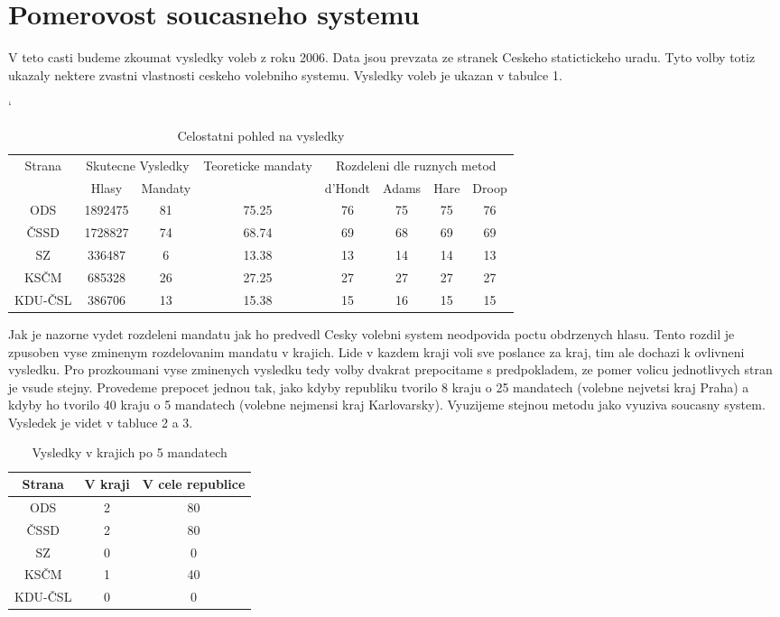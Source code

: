 \documentclass[12pt,a4paper]{scrreprt}
\begin{document}
\section{Pomerovost soucasneho systemu}
V teto casti budeme zkoumat vysledky voleb z roku 2006. 
Data jsou prevzata ze stranek Ceskeho statictickeho uradu.\autocite{CSU}
Tyto volby totiz ukazaly nektere zvastni vlastnosti ceskeho volebniho systemu.
Vysledky voleb je ukazan v tabulce 1.
\begin{table}[tbp]
\catcode`
\begin{tabular}{|c|c|c|c|c|c|c|c|}
\hline
\multirow{2}{*}{Strana}  & \multicolumn{2}{|c|}{Skutecne Vysledky} & \multirow{2}{*}{Teoreticke mandaty} & \multicolumn{4}{|c|}{Rozdeleni dle ruznych metod} \\ \cline{2-3} \cline{5-8}
& Hlasy & Mandaty & & d'Hondt & Adams & Hare & Droop \\  
\hline
ODS & 1892475 & 81 & 75.25 & 76 & 75 & 75 & 76 \\ 
\hline
ČSSD & 1728827 & 74 & 68.74 & 69 & 68 & 69 & 69 \\ 
\hline
SZ & 336487 & 6 & 13.38 & 13 & 14 & 14 & 13 \\ 
\hline
KSČM & 685328 & 26 & 27.25 & 27 & 27 & 27 & 27 \\ 
\hline
KDU-ČSL & 386706 & 13 & 15.38 & 15 & 16 & 15 & 15 \\ 
\hline
\end{tabular}
\caption{Celostatni pohled na vysledky}
\end{table}
Jak je nazorne vydet rozdeleni mandatu jak ho predvedl Cesky volebni system neodpovida poctu obdrzenych hlasu.
Tento rozdil je zpusoben vyse zminenym rozdelovanim mandatu v krajich.
Lide v kazdem kraji voli sve poslance  za kraj, tim ale dochazi k ovlivneni vysledku.
Pro prozkoumani vyse zminenych vysledku tedy volby dvakrat prepocitame s predpokladem, ze pomer volicu jednotlivych stran je vsude stejny.
Provedeme prepocet jednou tak, jako kdyby republiku tvorilo 8 kraju o 25 mandatech (volebne nejvetsi kraj Praha) a kdyby ho tvorilo 40 kraju o 5 mandatech (volebne nejmensi kraj Karlovarsky).
Vyuzijeme stejnou metodu jako vyuziva soucasny system.
Vysledek je videt v tabluce 2 a 3.
\begin{table}
\begin{center}
\begin{tabular}{|c|c|c|}
\hline
Strana & V kraji & V cele republice\\
\hline 
ODS & 2 & 80\\
\hline
ČSSD & 2 & 80\\
\hline
SZ & 0 & 0\\
\hline
KSČM & 1 & 40\\
\hline
KDU-ČSL & 0 & 0\\
\hline 
\end{tabular} 
\caption{Vysledky v krajich po 5 mandatech}
\end{center}
\end{table}
\end{document}
